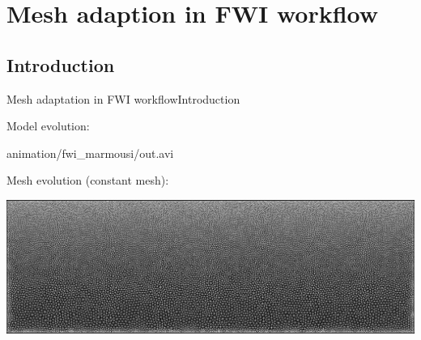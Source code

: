 \section{Mesh adaption in FWI workflow}
\subsection{Introduction}
\begin{frame}{Mesh adaptation in FWI workflow}{Introduction}
  \begin{block}{Model evolution:}
    \begin{center}
            {animation/fwi_marmousi/out.avi}
    \end{center}
  \end{block}

  \begin{block}{Mesh evolution (constant mesh):}
    \begin{center}
      \includegraphics[scale=0.16]{animation/fwi_mesh1_black/fwi_mesh1-00.png}
    \end{center}
  \end{block}

\end{frame}


